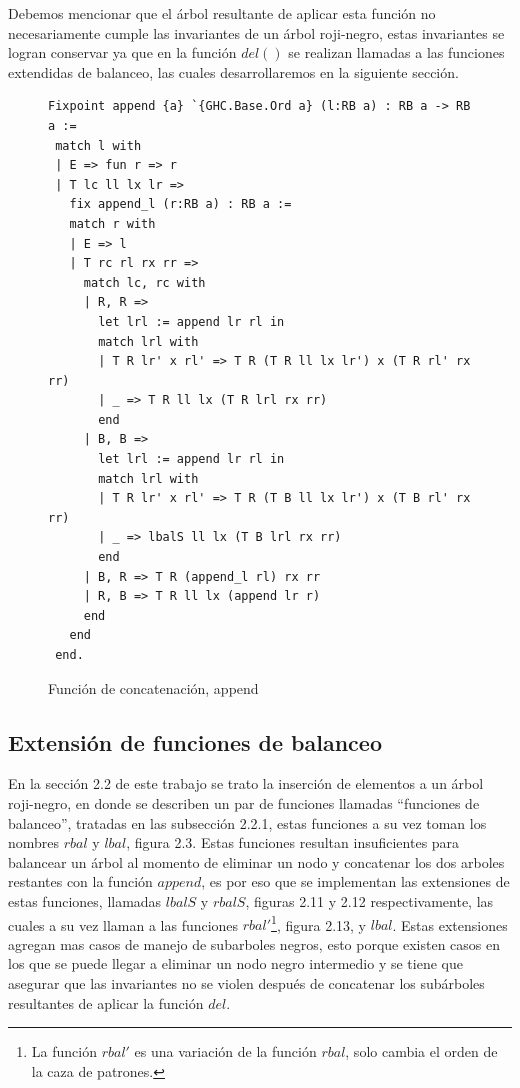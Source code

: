 \documentclass[8pt,leqno,pdflatex,spanish]{book}
\newcommand{\arn}{árbol roji-negro}
\theoremstyle{plain}
\theoremstyle{definition}
\theoremstyle{remark}
\begin{document}
Debemos mencionar que el \'arbol resultante de aplicar esta funci\'on no necesariamente cumple las 
invariantes de un {\arn}, estas invariantes se logran conservar ya que en la funci\'on $del()$ se 
realizan llamadas a las funciones extendidas de balanceo, las cuales desarrollaremos en la 
siguiente sección.

\begin{figure}
\centering 
\captionsetup{justification=centering}
\begin{verbatim}
Fixpoint append {a} `{GHC.Base.Ord a} (l:RB a) : RB a -> RB a :=
 match l with
 | E => fun r => r
 | T lc ll lx lr =>
   fix append_l (r:RB a) : RB a :=
   match r with
   | E => l
   | T rc rl rx rr =>
     match lc, rc with
     | R, R =>
       let lrl := append lr rl in
       match lrl with
       | T R lr' x rl' => T R (T R ll lx lr') x (T R rl' rx rr)
       | _ => T R ll lx (T R lrl rx rr)
       end
     | B, B =>
       let lrl := append lr rl in
       match lrl with
       | T R lr' x rl' => T R (T B ll lx lr') x (T B rl' rx rr)
       | _ => lbalS ll lx (T B lrl rx rr)
       end
     | B, R => T R (append_l rl) rx rr
     | R, B => T R ll lx (append lr r)
     end
   end
 end.
\end{verbatim}
\caption{Funci\'on de concatenaci\'on, append}
\end{figure}

\subsection{Extensi\'on de funciones de balanceo}

En la secci\'on 2.2 de este trabajo se trato la inserci\'on de elementos a un \arn, en donde se 
describen un par de funciones llamadas ``funciones de balanceo'', tratadas en las subsecci\'on 
2.2.1, estas funciones a su vez toman los nombres $rbal$ y $lbal$, figura 2.3. Estas funciones 
resultan insuficientes para balancear un \'arbol al momento de eliminar un nodo y concatenar los 
dos arboles restantes con la función $append$, es por eso que se implementan las extensiones de 
estas funciones, llamadas $lbalS$ y $rbalS$, figuras 2.11 y 2.12 respectivamente, las cuales a su 
vez llaman a las funciones $rbal'$\footnote{La funci\'on $rbal'$ es una variación de la función $
rbal$, solo cambia el orden de la caza de patrones.}, figura 2.13, y $lbal$. Estas extensiones 
agregan mas casos de manejo de subarboles negros, esto porque existen casos en los que se puede 
llegar a eliminar un nodo negro intermedio y se tiene que asegurar que las invariantes no se 
violen después de concatenar los subárboles resultantes de aplicar la función $del$.
\end{document}
